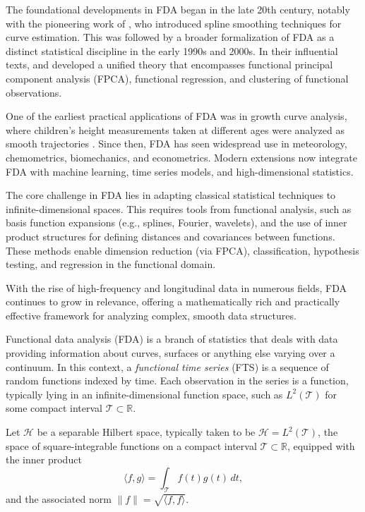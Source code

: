 \documentclass[article]{abntex2}
\begin{document}
The foundational developments in FDA began in the late 20th century, notably with the pioneering work of , who introduced spline smoothing techniques for curve estimation. This was followed by a broader formalization of FDA as a distinct statistical discipline in the early 1990s and 2000s. In their influential texts,  and  developed a unified theory that encompasses functional principal component analysis (FPCA), functional regression, and clustering of functional observations.

One of the earliest practical applications of FDA was in growth curve analysis, where children’s height measurements taken at different ages were analyzed as smooth trajectories . Since then, FDA has seen widespread use in meteorology, chemometrics, biomechanics, and econometrics. Modern extensions now integrate FDA with machine learning, time series models, and high-dimensional statistics.

The core challenge in FDA lies in adapting classical statistical techniques to infinite-dimensional spaces. This requires tools from functional analysis, such as basis function expansions (e.g., splines, Fourier, wavelets), and the use of inner product structures for defining distances and covariances between functions. These methods enable dimension reduction (via FPCA), classification, hypothesis testing, and regression in the functional domain.

With the rise of high-frequency and longitudinal data in numerous fields, FDA continues to grow in relevance, offering a mathematically rich and practically effective framework for analyzing complex, smooth data structures.




Functional data analysis (FDA) is a branch of statistics that deals with data providing information about curves, surfaces or anything else varying over a continuum. In this context, a \emph{functional time series} (FTS) is a sequence of random functions indexed by time. Each observation in the series is a function, typically lying in an infinite-dimensional function space, such as $L^2(\mathcal{T})$ for some compact interval $\mathcal{T} \subset \mathbb{R}$.

Let $\mathcal{H}$ be a separable Hilbert space, typically taken to be $\mathcal{H} = L^2(\mathcal{T})$, the space of square-integrable functions on a compact interval $\mathcal{T} \subset \mathbb{R}$, equipped with the inner product
\[
\langle f, g \rangle = \int_{\mathcal{T}} f(t) g(t) \, dt,
\]
and the associated norm $\|f\| = \sqrt{\langle f, f \rangle}$.
\end{document}
